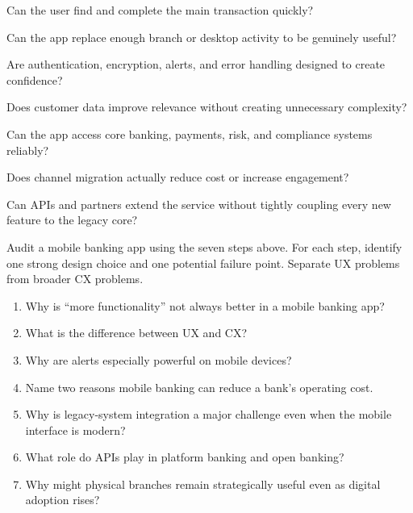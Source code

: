 \begin{utpsteps}
  \item {} Can the user find and complete the main transaction quickly?
  \item {} Can the app replace enough branch or desktop activity to be genuinely useful?
  \item {} Are authentication, encryption, alerts, and error handling designed to create confidence?
  \item {} Does customer data improve relevance without creating unnecessary complexity?
  \item {} Can the app access core banking, payments, risk, and compliance systems reliably?
  \item {} Does channel migration actually reduce cost or increase engagement?
  \item {} Can APIs and partners extend the service without tightly coupling every new feature to the legacy core?
\end{utpsteps}

\begin{tryit}
Audit a mobile banking app using the seven steps above. For each step, identify one strong design choice and one potential failure point. Separate UX problems from broader CX problems.
\end{tryit}

\begin{quickcheck}
\begin{enumerate}
  \item Why is ``more functionality'' not always better in a mobile banking app?
  \item What is the difference between UX and CX?
  \item Why are alerts especially powerful on mobile devices?
  \item Name two reasons mobile banking can reduce a bank's operating cost.
  \item Why is legacy-system integration a major challenge even when the mobile interface is modern?
  \item What role do APIs play in platform banking and open banking?
  \item Why might physical branches remain strategically useful even as digital adoption rises?
\end{enumerate}
\end{quickcheck}

